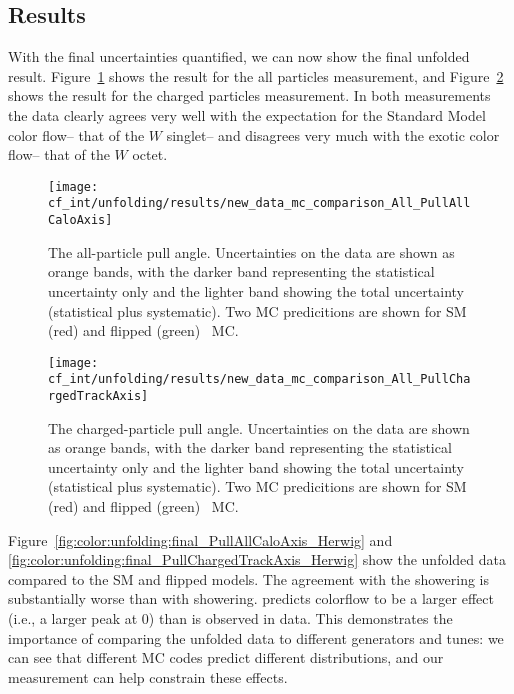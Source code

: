 \FloatBarrier

	\subsection{Results}

With the final uncertainties quantified, we can now show the final unfolded result. Figure~\ref{fig:color:unfolding:final_PullAllCaloAxis} shows the result for the all particles measurement, and Figure~\ref{fig:color:unfolding:final_PullChargedTrackAxis} shows the result for the charged particles measurement. In both measurements the data clearly agrees very well with the expectation for the Standard Model color flow-- that of the $W$ singlet-- and disagrees very much with the exotic color flow-- that of the $W$ octet. 


\begin{figure}
  \centering
  \texttt{[image: cf\_int/unfolding/results/new\_data\_mc\_comparison\_All\_PullAllCaloAxis]}
  \caption{The all-particle pull angle.
    Uncertainties on the data are shown as orange bands, with the darker band
    representing the statistical uncertainty only and the lighter band
    showing the total uncertainty (statistical plus systematic). Two MC predicitions
    are shown for SM (red) and flipped (green) \PowPythia\ MC.}
  \label{fig:color:unfolding:final_PullAllCaloAxis}
\end{figure}




\begin{figure}
  \centering
  \texttt{[image: cf\_int/unfolding/results/new\_data\_mc\_comparison\_All\_PullChargedTrackAxis]}
  \caption{The charged-particle pull angle.
    Uncertainties on the data are shown as orange bands, with the darker band
    representing the statistical uncertainty only and the lighter band
    showing the total uncertainty (statistical plus systematic). Two MC predicitions
    are shown for SM (red) and flipped (green) \PowPythia\ MC.}
  \label{fig:color:unfolding:final_PullChargedTrackAxis}
\end{figure}


\FloatBarrier

Figure~\ref{fig:color:unfolding:final_PullAllCaloAxis_Herwig} and \ref{fig:color:unfolding:final_PullChargedTrackAxis_Herwig} show the unfolded data compared to the \PowHerwig SM and flipped models. The agreement with the \Herwig showering is substantially worse than with \Pythia showering. \Herwig predicts colorflow to be a larger effect (i.e., a larger peak at 0) than is observed in data. This demonstrates the importance of comparing the unfolded data to different generators and tunes: we can see that different MC codes predict different distributions, and our measurement can help constrain these effects.


